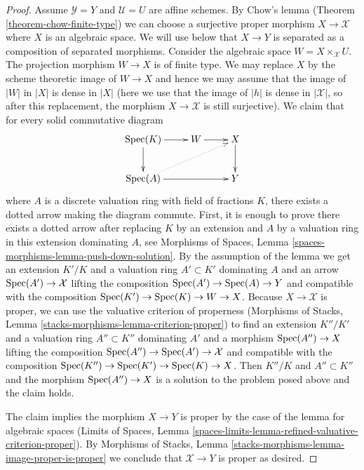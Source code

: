 \begin{proof}
\medskip\noindent
Assume $\mathcal{Y} = Y$ and $\mathcal{U} = U$ are affine schemes.
By Chow's lemma (Theorem \ref{theorem-chow-finite-type})
we can choose a surjective proper morphism $X \to \mathcal{X}$
where $X$ is an algebraic space. We will use below that $X \to Y$ is separated
as a composition of separated morphisms. Consider the
algebraic space $W = X \times_\mathcal{X} U$. The projection morphism
$W \to X$ is of finite type.
We may replace $X$ by the scheme theoretic image of
$W \to X$ and hence we may assume that the image of $|W|$ in $|X|$
is dense in $|X|$ (here we use that the image of $|h|$
is dense in $|\mathcal{X}|$, so after this replacement, the
morphism $X \to \mathcal{X}$ is still surjective).
We claim that for every solid commutative diagram
$$
\xymatrix{
\Spec(K) \ar[r] \ar[d] & W \ar[r] & X \ar[d] \\
\Spec(A) \ar[rr] \ar@{..>}[rru] & & Y
}
$$
where $A$ is a discrete valuation ring with field of fractions $K$, there
exists a dotted arrow making the diagram commute. First, it is enough to
prove there exists a dotted arrow after replacing $K$ by an extension
and $A$ by a valuation ring in this extension dominating $A$, see
Morphisms of Spaces, Lemma \ref{spaces-morphisms-lemma-push-down-solution}.
By the assumption of the lemma we get an extension $K'/K$ and a valuation
ring $A' \subset K'$ dominating $A$ and
an arrow $\mathop{\mathrm{Spec}}(A') \to \mathcal{X}$ lifting the composition
$\mathop{\mathrm{Spec}}(A') \to \mathop{\mathrm{Spec}}(A) \to Y$ and compatible with the composition
$\mathop{\mathrm{Spec}}(K') \to \mathop{\mathrm{Spec}}(K) \to W \to X$. Because $X \to \mathcal{X}$
is proper, we can use the valuative criterion of properness
(Morphisms of Stacks, Lemma \ref{stacks-morphisms-lemma-criterion-proper})
to find an extension $K''/K'$ and a valuation ring $A'' \subset K''$
dominating $A'$ and a morphism $\mathop{\mathrm{Spec}}(A'') \to X$ lifting the composition
$\mathop{\mathrm{Spec}}(A'') \to \mathop{\mathrm{Spec}}(A') \to \mathcal{X}$ and compatible with the composition
$\mathop{\mathrm{Spec}}(K'') \to \mathop{\mathrm{Spec}}(K') \to \mathop{\mathrm{Spec}}(K) \to X$.
Then $K''/K$ and $A'' \subset K''$ and the morphism $\mathop{\mathrm{Spec}}(A'') \to X$
is a solution to the problem posed above and the claim holds.

\medskip\noindent
The claim implies the morphism $X \to Y$ is proper by the
case of the lemma for algebraic spaces
(Limits of Spaces, Lemma
\ref{spaces-limits-lemma-refined-valuative-criterion-proper}).
By Morphisms of Stacks, Lemma
\ref{stacks-morphisms-lemma-image-proper-is-proper}
we conclude that $\mathcal{X} \to Y$ is proper as desired.
\end{proof}

